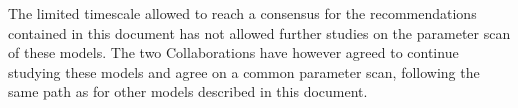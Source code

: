 
The limited timescale allowed to reach a consensus for
the recommendations contained in this document has not allowed further studies on the 
parameter scan of these models. The two Collaborations have however agreed to continue studying
these models and agree on a common parameter scan,
following the same path as for other models described in this document.  

